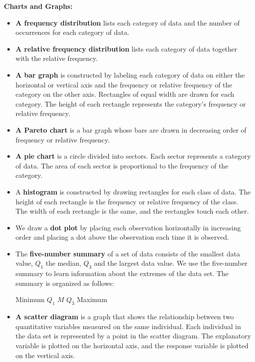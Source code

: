 \documentclass{report}
\begin{document}
        \pagebreak \bigbreak \noindent
        \begin{large}
          \textbf{Charts and Graphs:}
        \end{large}
        \begin{itemize}
           \item \textbf{A frequency distribution} lists each category of data and the number of occurrences for each category of data.
           \item \textbf{A relative frequency distribution} lists each category of data together with the relative frequency.
             \item \textbf{A bar graph} is constructed by labeling each category of data on either the horizontal or vertical axis and the frequency or relative frequency of the category on the other axis. Rectangles of equal width are drawn for each category. The height of each rectangle represents the category's frequency or relative frequency.
            \item \textbf{A Pareto chart} is a bar graph whose bars are drawn in decreasing order of frequency or relative frequency.
            \item \textbf{A pie chart} is a circle divided into sectors. Each sector represents a category of data. The area of each sector is proportional to the frequency of the category.
            \item A \textbf{histogram} is constructed by drawing rectangles for each class of data. The height of each rectangle is the frequency or relative frequency of the class. The width of each rectangle is the same, and the rectangles touch each other.
            \item We draw a \textbf{dot plot} by placing each observation horizontally in increasing order and placing a dot above the observation each time it is observed.
             \item The \textbf{five-number summary} of a set of data consists of the smallest data value, $Q_{1} $  the median, $Q_{3} $  and the largest data value. We use the five-number summary to learn information about the extremes of the data set. The summary is organized as follows:
              \begin{center}
                 Minimum $Q_{1} $ $M$ $Q_{3} $  Maximum
              \end{center}
        \item \textbf{A scatter diagram} is a graph that shows the relationship between two quantitative variables measured on the same individual. Each individual in the data set is represented by a point in the scatter diagram. The explanatory variable is plotted on the horizontal axis, and the response variable is plotted on the vertical axis.

\end{itemize}
\end{document}

